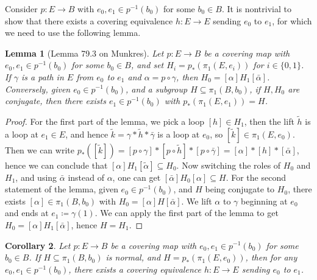 \documentclass[11pt]{book}
\theoremstyle{break}
\theoremstyle{break}
\newtheorem{lem}{Lemma}[thm]
\newtheorem{corT}[lem]{Corollary}
\newcommand{\that}[1]{\widetilde{#1}}
\begin{document}
Consider $p:E \to B$ with $e_0,e_1 \in p^{-1}(b_0)$ for some $b_0 \in B$. It is nontrivial to show that there exists a covering equivalence $h:E \to E$ sending $e_0$ to $e_1$, for which we need to use the following lemma. 
\begin{lem}[Lemma 79.3 on Munkres]
Let $p:E \to B$ be a covering map with $e_0,e_1 \in p^{-1}(b_0)$ for some $b_0 \in B$, and set $H_i = p_*(\pi_1(E,e_i))$ for $i \in \{0,1\}$. If $\gamma$ is a path in $E$ from $e_0$ to $e_1$ and $\alpha = p \circ \gamma$, then $H_0 = [\alpha] H_1 [\bar{\alpha}]$. Conversely, given $e_0 \in p^{-1}(b_0)$, and a subgroup $H \subseteq \pi_1(B,b_0)$, if $H,H_0$ are conjugate, then there exists $e_1 \in p^{-1}(b_0)$ with $p_*(\pi_1(E,e_1)) = H$.  
\end{lem}
\begin{proof}
For the first part of the lemma, we pick a loop $[h] \in H_1$, then the lift $\that{h}$ is a loop at $e_1 \in E$, and hence $\that{k} = \gamma* \that{h}* \bar{\gamma}$ is a loop at $e_0$, so $[\that{k}] \in \pi_1(E,e_0)$. Then we can write $p_*([\that{k}]) = [p\circ \gamma]*[p\circ \that{h}]*[p \circ \bar{\gamma}] = [\alpha ]* [h]*[\bar{\alpha}]$, hence we can conclude that $[\alpha]H_1 [\that{\alpha}] \subseteq H_0$. Now switching the roles of $H_0$ and $H_1$, and using $\bar{\alpha}$ instead of $\alpha$, one can get $[\bar{\alpha}]H_0[\alpha]\subseteq H$. For the second statement of the lemma, given $e_0 \in p^{-1}(b_0)$, and $H$ being conjugate to $H_0$, there exists $[\alpha] \in \pi_1(B,b_0)$ with $H_0 = [\alpha] H [\bar{\alpha}]$. We lift $\alpha$ to $\gamma$ beginning at $e_0$ and ends at $e_1 \coloneqq \gamma(1)$. We can apply the first part of the lemma to get $H_0 = [\alpha]H_1 [\bar{\alpha}] $, hence $H = H_1$. 
\end{proof}

\begin{corT}
Let $p:E \to B$ be a covering map with $e_0,e_1 \in p^{-1}(b_0)$ for some $b_0 \in B$. If $H\subseteq \pi_1(B,b_0)$ is normal, and $H = p_*(\pi_1(E,e_0))$, then for any $e_0,e_1 \in p^{-1}(b_0)$, there exists a covering equivalence $h:E \to E$ sending $e_0$ to $e_1$. 
\end{corT}
\newpage
\end{document}
